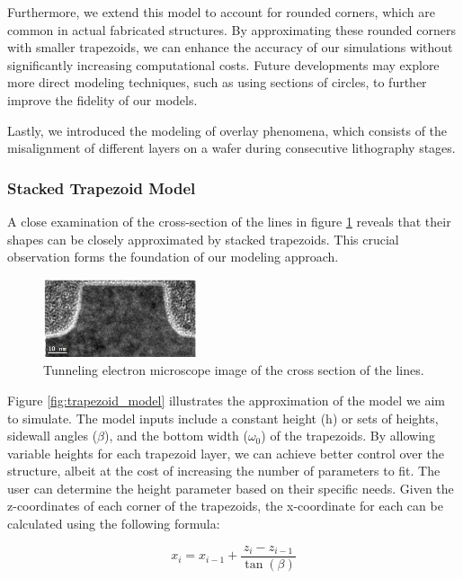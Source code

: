 Furthermore, we extend this model to account for rounded corners, which are common in actual fabricated structures. By approximating these rounded corners with smaller trapezoids, we can enhance the accuracy of our simulations without significantly increasing computational costs. Future developments may explore more direct modeling techniques, such as using sections of circles, to further improve the fidelity of our models.

Lastly, we introduced the modeling of overlay phenomena, which consists of the misalignment of different layers on a wafer during consecutive lithography stages.
\subsubsection{Stacked Trapezoid Model}

A close examination of the cross-section of the lines in figure \ref{fig:trapezoid} reveals that their shapes can be closely approximated by stacked trapezoids. This crucial observation forms the foundation of our modeling approach.

\medskip

\begin{figure}[h]
    \centering
    \includegraphics[width=0.4\textwidth]{images/trap_model.PNG}
    \caption{Tunneling electron microscope image of the cross section of the lines.\cite{phd_freychet}}
    \label{fig:trapezoid}
\end{figure}


Figure \ref{fig:trapezoid_model} illustrates the approximation of the model we aim to simulate. 
The model inputs include a constant height (h) or sets of heights, sidewall angles ($\beta$), and the
bottom width ($\omega_{0}$) of the trapezoids. By allowing variable heights for each trapezoid layer, we can 
achieve better control over the structure, albeit at the cost of increasing the number of 
parameters to fit. The user can determine the height parameter based on their specific needs. 
Given the z-coordinates of each corner of the trapezoids, the x-coordinate for each can be 
calculated using the following formula:

\medskip

\begin{equation}
    x_{i} = x_{i-1} + \frac{z_{i} - z_{i-1}}{\tan(\beta)}
\end{equation}

